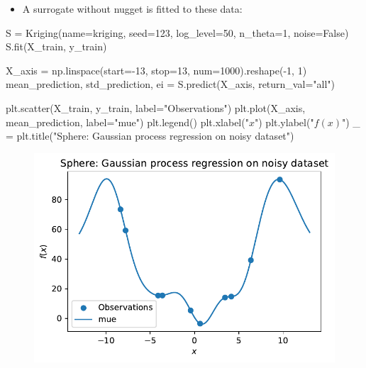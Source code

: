 \documentclass[
  letterpaper,
  DIV=11,
  numbers=noendperiod]{scrreprt}
\newenvironment{Shaded}{\begin{snugshade}}{\end{snugshade}}
\newcommand{\DecValTok}[1]{\textcolor[rgb]{0.68,0.00,0.00}{#1}}
\newcommand{\NormalTok}[1]{\textcolor[rgb]{0.00,0.23,0.31}{#1}}
\newcommand{\OperatorTok}[1]{\textcolor[rgb]{0.37,0.37,0.37}{#1}}
\newcommand{\StringTok}[1]{\textcolor[rgb]{0.13,0.47,0.30}{#1}}
\newcommand{\VariableTok}[1]{\textcolor[rgb]{0.07,0.07,0.07}{#1}}
\providecommand{\tightlist}{%
  \setlength{\itemsep}{0pt}\setlength{\parskip}{0pt}}\usepackage{longtable,booktabs,array}
\begin{document}
\begin{itemize}
\tightlist
\item
  A surrogate without nugget is fitted to these data:
\end{itemize}

\begin{Shaded}
\begin{Highlighting}[]
\NormalTok{S }\OperatorTok{=}\NormalTok{ Kriging(name}\OperatorTok{=}\StringTok{\textquotesingle{}kriging\textquotesingle{}}\NormalTok{,}
\NormalTok{            seed}\OperatorTok{=}\DecValTok{123}\NormalTok{,}
\NormalTok{            log\_level}\OperatorTok{=}\DecValTok{50}\NormalTok{,}
\NormalTok{            n\_theta}\OperatorTok{=}\DecValTok{1}\NormalTok{,}
\NormalTok{            noise}\OperatorTok{=}\VariableTok{False}\NormalTok{)}
\NormalTok{S.fit(X\_train, y\_train)}

\NormalTok{X\_axis }\OperatorTok{=}\NormalTok{ np.linspace(start}\OperatorTok{={-}}\DecValTok{13}\NormalTok{, stop}\OperatorTok{=}\DecValTok{13}\NormalTok{, num}\OperatorTok{=}\DecValTok{1000}\NormalTok{).reshape(}\OperatorTok{{-}}\DecValTok{1}\NormalTok{, }\DecValTok{1}\NormalTok{)}
\NormalTok{mean\_prediction, std\_prediction, ei }\OperatorTok{=}\NormalTok{ S.predict(X\_axis, return\_val}\OperatorTok{=}\StringTok{"all"}\NormalTok{)}

\NormalTok{plt.scatter(X\_train, y\_train, label}\OperatorTok{=}\StringTok{"Observations"}\NormalTok{)}
\NormalTok{plt.plot(X\_axis, mean\_prediction, label}\OperatorTok{=}\StringTok{"mue"}\NormalTok{)}
\NormalTok{plt.legend()}
\NormalTok{plt.xlabel(}\StringTok{"$x$"}\NormalTok{)}
\NormalTok{plt.ylabel(}\StringTok{"$f(x)$"}\NormalTok{)}
\NormalTok{\_ }\OperatorTok{=}\NormalTok{ plt.title(}\StringTok{"Sphere: Gaussian process regression on noisy dataset"}\NormalTok{)}
\end{Highlighting}
\end{Shaded}

\begin{figure}[H]

{\centering \includegraphics{013_num_spot_noisy_files/figure-pdf/cell-14-output-1.pdf}

}

\end{figure}
\end{document}
